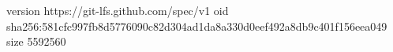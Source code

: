 version https://git-lfs.github.com/spec/v1
oid sha256:581cfc997fb8d5776090c82d304ad1da8a330d0eef492a8db9c401f156eea049
size 5592560
